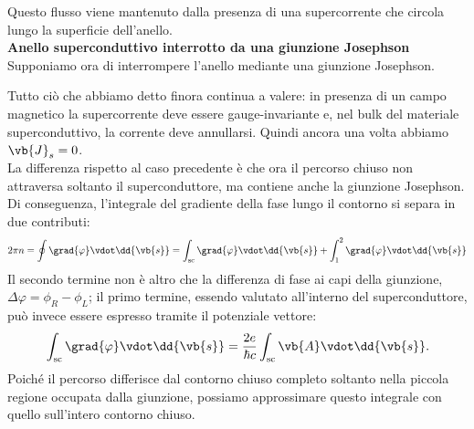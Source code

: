 Questo flusso viene mantenuto dalla presenza di una supercorrente che circola lungo la superficie dell'anello.\\[0.2cm]
\textbf{Anello superconduttivo interrotto da una giunzione Josephson}\\
Supponiamo ora di interrompere l'anello mediante una giunzione Josephson.
\begin{figure}[H]
    \centering
\end{figure}
\hspace{-0.6cm}Tutto ciò che abbiamo detto finora continua a valere: in presenza di un campo magnetico la supercorrente deve essere gauge-invariante e, nel bulk del materiale superconduttivo, la corrente deve annullarsi. Quindi ancora una volta abbiamo $\vb{J}_s=0$.\\
La differenza rispetto al caso precedente è che ora il percorso chiuso non attraversa soltanto il superconduttore, ma contiene anche la giunzione Josephson. Di conseguenza, l'integrale del gradiente della fase lungo il contorno si separa in due contributi:
\begin{equation*}
    2\pi n
    =\oint \grad{\varphi}\vdot\dd{\vb{s}}
    =\int_{\text{sc}} \grad{\varphi}\vdot\dd{\vb{s}} + \int_{1}^{2} \grad{\varphi}\vdot\dd{\vb{s}}
\end{equation*}
Il secondo termine non è altro che la differenza di fase ai capi della giunzione, $\Delta\varphi = \phi_R-\phi_L$; il primo termine, essendo valutato all'interno del superconduttore, può invece essere espresso tramite il potenziale vettore:
\begin{equation*}
    \int_{\text{sc}}
    \grad{\varphi}\vdot\dd{\vb{s}}
    =
    \frac{2e}{\hbar c}
    \int_{\text{sc}}
    \vb{A}\vdot\dd{\vb{s}}.
\end{equation*}
Poiché il percorso differisce dal contorno chiuso completo soltanto nella piccola regione occupata dalla giunzione, possiamo approssimare questo integrale con quello sull'intero contorno chiuso.
